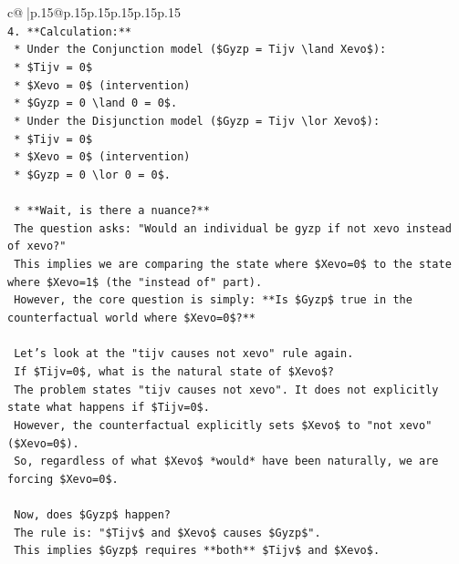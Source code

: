 \documentclass{article}
\begin{document}
{\begin{supertabular}{c@{$\;$}|p{.15\linewidth}@{}p{.15\linewidth}p{.15\linewidth}p{.15\linewidth}p{.15\linewidth}p{.15\linewidth}}
{{{\\ 
\texttt{4.  **Calculation:**} \\
\texttt{    *   Under the Conjunction model (\$Gyzp = Tijv \textbackslash{}land Xevo\$):} \\
\texttt{        *   \$Tijv = 0\$} \\
\texttt{        *   \$Xevo = 0\$ (intervention)} \\
\texttt{        *   \$Gyzp = 0 \textbackslash{}land 0 = 0\$.} \\
\texttt{    *   Under the Disjunction model (\$Gyzp = Tijv \textbackslash{}lor Xevo\$):} \\
\texttt{        *   \$Tijv = 0\$} \\
\texttt{        *   \$Xevo = 0\$ (intervention)} \\
\texttt{        *   \$Gyzp = 0 \textbackslash{}lor 0 = 0\$.} \\
\\ 
\texttt{    *   **Wait, is there a nuance?**} \\
\texttt{        The question asks: "Would an individual be gyzp if not xevo instead of xevo?"} \\
\texttt{        This implies we are comparing the state where \$Xevo=0\$ to the state where \$Xevo=1\$ (the "instead of" part).} \\
\texttt{        However, the core question is simply: **Is \$Gyzp\$ true in the counterfactual world where \$Xevo=0\$?**} \\
\\ 
\texttt{        Let's look at the "tijv causes not xevo" rule again.} \\
\texttt{        If \$Tijv=0\$, what is the natural state of \$Xevo\$?} \\
\texttt{        The problem states "tijv causes not xevo". It does not explicitly state what happens if \$Tijv=0\$.} \\
\texttt{        However, the counterfactual explicitly sets \$Xevo\$ to "not xevo" (\$Xevo=0\$).} \\
\texttt{        So, regardless of what \$Xevo\$ *would* have been naturally, we are forcing \$Xevo=0\$.} \\
\\ 
\texttt{        Now, does \$Gyzp\$ happen?} \\
\texttt{        The rule is: "\$Tijv\$ and \$Xevo\$ causes \$Gyzp\$".} \\
\texttt{        This implies \$Gyzp\$ requires **both** \$Tijv\$ and \$Xevo\$.} \\
}}}
\end{supertabular}}
\end{document}
